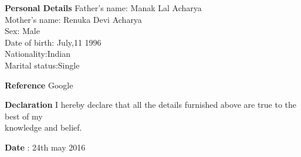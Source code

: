 \documentclass{article}
\begin{document}
	      
	      \begin{flushleft}
	      	\vspace{0.4in}
	      	\textbf{Personal Details} \hspace{0.36in}Father's name: \hspace{0.13in} Manak Lal Acharya \\
	      	\hspace{1.55in}Mother's name: \hspace{0.08in} Renuka Devi Acharya\\
	      	\hspace{1.55in}Sex:\hspace{0.85in} Male\\
	      	\hspace{1.55in}Date of birth:\hspace{0.255in} July,11 1996	\\
	      	\hspace{1.55in}Nationality:\hspace{0.45in}Indian\\
	      	\hspace{1.55in}Marital status:\hspace{0.28in}Single
	      	
	      \end{flushleft}
	      
	      
	      \begin{flushleft}
	      	\vspace{0.4in}
	      	\textbf{Reference} \hspace{0.75in} Google
	      \end{flushleft}
	      
	      \begin{flushleft}
	      	\vspace{0.2in}
	      	\textbf{Declaration} \hspace{0.60in}  I hereby declare that all the details furnished above are true to the best of
	      	my\\\hspace{3.7cm} knowledge and belief.
	      \end{flushleft}
	      
	      \begin{flushleft}
	      	\vspace{0.2in}
	      	\textbf{Date} : 24th may 2016
	      \end{flushleft}
	    
\end{document}
